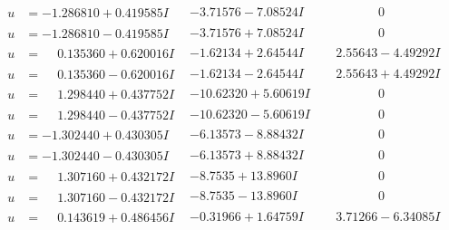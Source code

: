 \documentclass[1p]{elsarticle_modified}
\theoremstyle{definition}
\begin{document}
$$\begin{array}{c|c|c}
\begin{aligned}
u &= -1.286810 + 0.419585 I\end{aligned}
 & -3.71576 - 7.08524 I & \phantom{-0.000000 } 0 \\ \hline\begin{aligned}
u &= -1.286810 - 0.419585 I\end{aligned}
 & -3.71576 + 7.08524 I & \phantom{-0.000000 } 0 \\ \hline\begin{aligned}
u &= \phantom{-}0.135360 + 0.620016 I\end{aligned}
 & -1.62134 + 2.64544 I & \phantom{-}2.55643 - 4.49292 I \\ \hline\begin{aligned}
u &= \phantom{-}0.135360 - 0.620016 I\end{aligned}
 & -1.62134 - 2.64544 I & \phantom{-}2.55643 + 4.49292 I \\ \hline\begin{aligned}
u &= \phantom{-}1.298440 + 0.437752 I\end{aligned}
 & -10.62320 + 5.60619 I & \phantom{-0.000000 } 0 \\ \hline\begin{aligned}
u &= \phantom{-}1.298440 - 0.437752 I\end{aligned}
 & -10.62320 - 5.60619 I & \phantom{-0.000000 } 0 \\ \hline\begin{aligned}
u &= -1.302440 + 0.430305 I\end{aligned}
 & -6.13573 - 8.88432 I & \phantom{-0.000000 } 0 \\ \hline\begin{aligned}
u &= -1.302440 - 0.430305 I\end{aligned}
 & -6.13573 + 8.88432 I & \phantom{-0.000000 } 0 \\ \hline\begin{aligned}
u &= \phantom{-}1.307160 + 0.432172 I\end{aligned}
 & -8.7535 + 13.8960 I & \phantom{-0.000000 } 0 \\ \hline\begin{aligned}
u &= \phantom{-}1.307160 - 0.432172 I\end{aligned}
 & -8.7535 - 13.8960 I & \phantom{-0.000000 } 0 \\ \hline\begin{aligned}
u &= \phantom{-}0.143619 + 0.486456 I\end{aligned}
 & -0.31966 + 1.64759 I & \phantom{-}3.71266 - 6.34085 I \\ \hline\begin{aligned}

\end{aligned}
\end{array}$$
\end{document}
